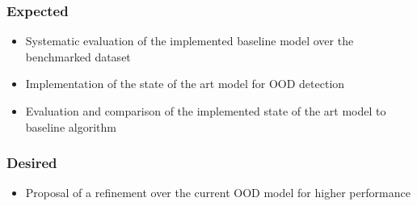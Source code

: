 \documentclass[thesis]{mas_proposal}
\begin{document}
\subsubsection*{Expected}
\begin{itemize}
    \item Systematic evaluation of the implemented baseline model over the benchmarked dataset
    \item Implementation of the state of the art model for OOD detection
    \item Evaluation and comparison of the implemented state of the art model to baseline algorithm
\end{itemize}

\subsubsection*{Desired}
\begin{itemize}
    \item Proposal of a refinement over the current OOD model for higher performance
\end{itemize}


\nocite{*}

\end{document}
